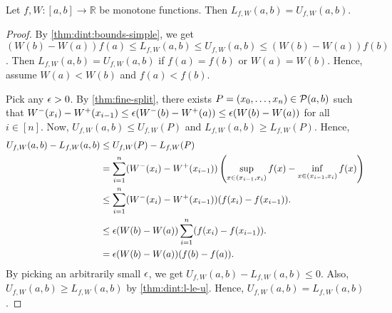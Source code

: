 \documentclass[a4paper,12pt,fleqn]{article}
\begin{document}
\begin{lemma}
\label{thm:dint:monotone}
Let $f, W: [a, b] \to \mathbb{R}$ be monotone functions.
Then $L_{f,W}(a, b) = U_{f,W}(a, b)$.
\end{lemma}
\begin{proof}
By \cref{thm:dint:bounds-simple}, we get
$(W(b)-W(a))f(a) \le L_{f,W}(a, b) \le U_{f,W}(a, b) \le (W(b)-W(a))f(b)$.
Then $L_{f,W}(a, b) = U_{f,W}(a, b)$ if $f(a) = f(b)$ or $W(a) = W(b)$.
Hence, assume $W(a) < W(b)$ and $f(a) < f(b)$.

Pick any $\epsilon > 0$. By \cref{thm:fine-split},
there exists $P = (x_0, \ldots, x_n) \in \mathcal{P}(a, b)$ such that
$W^-(x_i) - W^+(x_{i-1}) \le \epsilon(W^-(b) - W^+(a)) \le \epsilon(W(b) - W(a))$ for all $i \in [n]$.
Now, $U_{f,W}(a, b) \le U_{f,W}(P)$ and $L_{f,W}(a, b) \ge L_{f,W}(P)$. Hence,
\begin{align*}
U_{f,W}(a, b) - L_{f,W}(a, b) &\le U_{f,W}(P) - L_{f,W}(P)
\\ &= \sum_{i=1}^n (W^-(x_i) - W^+(x_{i-1}))
    \left(\sup_{x \in (x_{i-1}, x_i)} f(x) - \inf_{x \in (x_{i-1}, x_i)} f(x)\right)
\\ &\le \sum_{i=1}^n (W^-(x_i) - W^+(x_{i-1}))(f(x_i) - f(x_{i-1})).
\\ &\le \epsilon(W(b)-W(a)) \sum_{i=1}^n (f(x_i) - f(x_{i-1})).
\\ &= \epsilon(W(b)-W(a))(f(b)-f(a)).
\end{align*}
By picking an arbitrarily small $\epsilon$, we get $U_{f,W}(a, b) - L_{f,W}(a, b) \le 0$.
Also, $U_{f,W}(a, b) \ge L_{f,W}(a, b)$ by \cref{thm:dint:l-le-u}.
Hence, $U_{f,W}(a, b) = L_{f,W}(a, b)$.
\end{proof}
\end{document}
